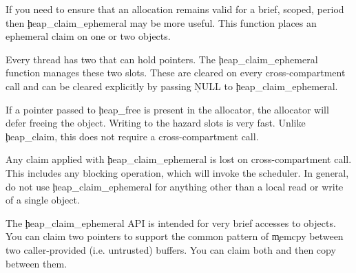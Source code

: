 
If you need to ensure that an allocation remains valid for a brief, scoped, period then \c{heap_claim_ephemeral} may be more useful.
This function places an ephemeral claim on one or two objects.


Every thread has two  that can hold pointers.
The \c{heap_claim_ephemeral} function manages these two slots.
These are cleared on every cross-compartment call and can be cleared explicitly by passing \c{NULL} to \c{heap_claim_ephemeral}.

If a pointer passed to \c{heap_free} is present in the allocator, the allocator will defer freeing the object.
Writing to the hazard slots is very fast.
Unlike \c{heap_claim}, this does not require a cross-compartment call.

\begin{caution}
	Any claim applied with \c{heap_claim_ephemeral} is lost on  cross-compartment call.
	This includes any blocking operation, which will invoke the scheduler.
	In general, do not use \c{heap_claim_ephemeral} for anything other than a local read or write of a single object.
\end{caution}

The \c{heap_claim_ephemeral} API is intended for very brief accesses to objects.
You can claim two pointers to support the common pattern of \c{memcpy} between two caller-provided (i.e. untrusted) buffers.
You can claim both and then copy between them.
